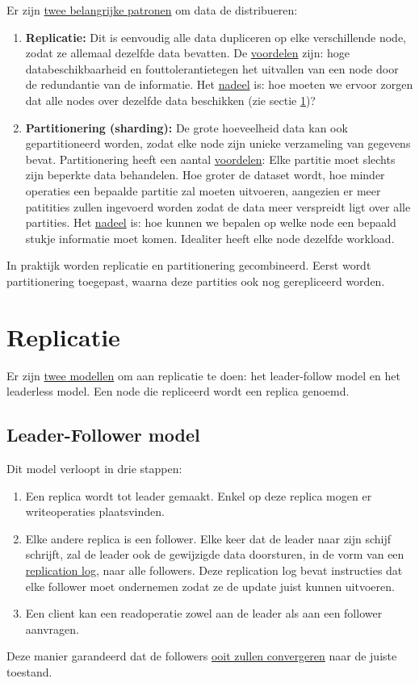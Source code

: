 	Er zijn \underline{twee belangrijke patronen} om data de distribueren:
	\begin{enumerate}
		\item[\info]\textbf{Replicatie:} Dit is eenvoudig alle data dupliceren op elke verschillende node, zodat ze allemaal dezelfde data bevatten. De \underline{voordelen} zijn: hoge databeschikbaarheid en fouttolerantietegen het uitvallen van een node door de redundantie van de informatie. Het \underline{nadeel} is: hoe moeten we ervoor zorgen dat alle nodes over dezelfde data beschikken (zie sectie \ref{sec:replicatie})? 
		\item[\info]\textbf{Partitionering (sharding):} De grote hoeveelheid data kan ook gepartitioneerd worden, zodat elke node zijn unieke verzameling van gegevens bevat. Partitionering heeft een aantal \underline{voordelen}: Elke partitie moet slechts zijn beperkte data behandelen. Hoe groter de dataset wordt, hoe minder operaties een bepaalde partitie zal moeten uitvoeren, aangezien er meer patitities zullen ingevoerd worden zodat de data meer verspreidt ligt over alle partities. Het \underline{nadeel} is: hoe kunnen we bepalen op welke node een bepaald stukje informatie moet komen. Idealiter heeft elke node dezelfde workload.
	\end{enumerate}
	In praktijk worden replicatie en partitionering gecombineerd. Eerst wordt partitionering toegepast, waarna deze partities ook nog gerepliceerd worden.

	\section{Replicatie}
	\label{sec:replicatie}
	Er zijn \underline{twee modellen} om aan replicatie te doen: het leader-follow model en het leaderless model. Een node die repliceerd wordt een replica genoemd.
	\subsection{Leader-Follower model}
	Dit model verloopt in drie stappen:
	\begin{enumerate}
		\item Een replica wordt tot leader gemaakt. Enkel op deze replica mogen er writeoperaties plaatsvinden.
		\item Elke andere replica is een follower. Elke keer dat de leader naar zijn schijf schrijft, zal de leader ook de gewijzigde data doorsturen, in de vorm van een \underline{replication log}, naar alle followers. Deze replication log bevat instructies dat elke follower moet ondernemen zodat ze de update juist kunnen uitvoeren.
		\item Een client kan een readoperatie zowel aan de leader als aan een follower aanvragen. 
	\end{enumerate}
	Deze manier garandeerd dat de followers \underline{ooit zullen convergeren} naar de juiste toestand.

